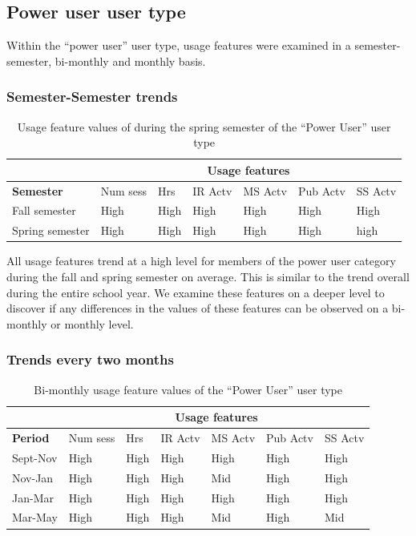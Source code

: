 \documentclass{acm_proc_article-sp}
\begin{document}
\subsection {Power user user type}
Within the ``power user'' user type, usage features were examined in a semester-semester, bi-monthly and monthly basis.

\subsubsection{Semester-Semester trends}

\begin{table}
\caption{Usage feature values of during the spring semester of the ``Power User'' user type}
\label{cluster1semester}
\begin{tabular}{|p{1.5cm}|p{0.6cm}|p{0.6cm}|p{0.6cm}|p{0.6cm}|p{0.8cm}|p{0.8cm}|}
\hline
& \multicolumn{6}{c|}{\textbf{Usage features}}  \\ \hline
 \textbf{Semester} 
 & Num sess & Hrs & IR Actv & MS Actv & Pub Actv & SS Actv \\ \hline
Fall  semester & High & High  & High & High & High & High \\ \hline
Spring semester & High & High  & High & High & High & high \\ \hline
\end{tabular}
\end{table}

All usage features trend at a high level for members of the power user category during the fall and spring semester on average. This is similar to the trend overall during the entire school year. We examine these features on a deeper level to discover if any differences in the values of these features can be observed on a bi-monthly or monthly level.

\subsubsection{Trends every two months}
\begin{table}
\caption{Bi-monthly usage feature values of the ``Power User'' user type}
\label{cluster1bimonthly}
\begin{tabular}{|p{1.5cm}|p{0.6cm}|p{0.6cm}|p{0.6cm}|p{0.6cm}|p{0.8cm}|p{0.8cm}|}
\hline
& \multicolumn{6}{c|}{\textbf{Usage features}}  \\ \hline
 \textbf{Period} 
 & Num sess & Hrs & IR Actv & MS Actv & Pub Actv & SS Actv \\ \hline
Sept-Nov & High & High  & High & High & High & High \\ \hline
Nov-Jan & High & High  & High & Mid & High & High \\ \hline
Jan-Mar & High & High  & High & High & High & High \\ \hline
Mar-May & High & High  & High & Mid & High & Mid \\ \hline
\end{tabular}
\end{table}
\end{document}
